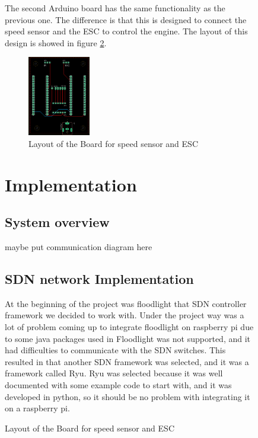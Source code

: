 \documentclass[11pt, titlepage]{article} %
\begin{document}
\begin{figure}
The second Arduino board has the same functionality as the previous one. The difference is that this is designed to connect the speed sensor and the ESC to control the engine. The layout of this design is showed in figure \ref{fig:board_layout_ir_esc}.

\begin{figure}
	\includegraphics[width=0.3\textwidth]{borad_layout_ir_esc.png}
	\caption{Layout of the Board for speed sensor and ESC}
	\label{fig:board_layout_ir_esc}
\end{figure}


\clearpage
\section{Implementation}

\subsection{System overview}
maybe put communication diagram here

\subsection{SDN network Implementation}

At the beginning of the project was floodlight that SDN controller framework we decided to work with. Under the project way was a lot of problem coming up to integrate floodlight on raspberry pi due to some java packages used in Floodlight was not supported, and it had difficulties to communicate with the SDN switches. This resulted in that another SDN framework was selected, and it was a framework called Ryu. Ryu was selected because it was well documented with some example code to start with, and it was developed in python, so it should be no problem with integrating it on a raspberry pi. 


\end{figure}
\end{document}
